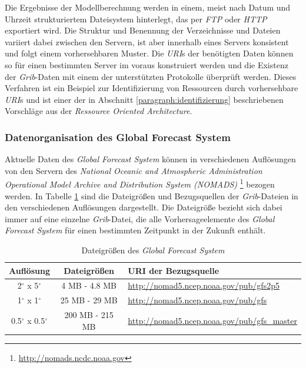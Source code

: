 Die Ergebnisse der Modellberechnung werden in einem, meist nach Datum
und Uhrzeit strukturiertem Dateisystem hinterlegt, das per
\textit{FTP} oder \textit{HTTP} exportiert wird. Die Struktur und
Benennung der Verzeichnisse und Dateien variiert dabei zwischen den
Servern, ist aber innerhalb eines Servers konsistent und folgt einem
vorhersehbaren Muster. Die \textit{URI}s der benötigten Daten können
so für einen bestimmten Server im voraus konstruiert werden und die
Existenz der \textit{Grib}-Daten mit einem der unterstützten
Protokolle überprüft werden. Dieses Verfahren ist ein Beispiel zur
Identifizierung von Ressourcen durch vorhersehbare \textit{URI}s und
ist einer der in Abschnitt \ref{paragraph:identifizierung}
beschriebenen Vorschläge aus der \textit{Ressource Oriented
  Architecture}.

\subsubsection{Datenorganisation des Global Forecast System}
Aktuelle Daten des \textit{Global Forecast System} können in
verschiedenen Auflösungen von den Servern des \textit{National Oceanic
  and Atmospheric Administration Operational Model Archive and
  Distribution System (NOMADS)} 
\footnote{\url{http://nomads.ncdc.noaa.gov}} bezogen werden. In
Tabelle \ref{tab:gfs_auflösungen} sind die Dateigrößen und
Bezugsquellen der \textit{Grib}-Dateien in den verschiedenen
Auflösungen dargestellt. Die Dateigröße bezieht sich dabei immer auf
eine einzelne \textit{Grib}-Datei, die alle Vorhersageelemente des
\textit{Global Forecast System} für einen bestimmten Zeitpunkt in der
Zukunft enthält.

\begin{table}[h]
  \centering
  {\sf
    \footnotesize
    \begin{longtable}{@{}ccl}
      \toprule
      \textbf{Auflösung} & \textbf{Dateigrößen} & \textbf{URI der Bezugsquelle} \\
      \midrule
      2$^{\circ}$ x 5$^{\circ}$ & 4 MB - 4.8 MB & \url{http://nomad5.ncep.noaa.gov/pub/gfs2p5} \\
      1$^{\circ}$ x 1$^{\circ}$ & 25 MB - 29 MB & \url{http://nomad5.ncep.noaa.gov/pub/gfs} \\
      0.5$^{\circ}$ x 0.5$^{\circ}$ & 200 MB - 215 MB & \url{http://nomad5.ncep.noaa.gov/pub/gfs_master} \\
      \bottomrule
    \end{longtable}
  }
  \caption{Dateigrößen des \textit{Global Forecast System}}
  \label{tab:gfs_auflösungen}
\end{table}

